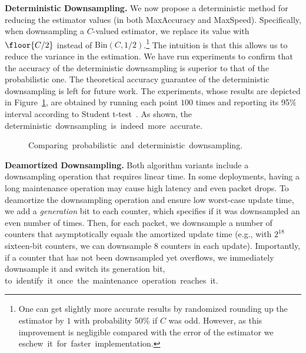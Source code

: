 \noindent\textbf{Deterministic Downsampling.}\quad{}
We now propose a deterministic method for reducing the estimator values (in both {\sc MaxAccuracy} and {\sc MaxSpeed}). Specifically, when downsampling a $C$-valued estimator, we replace its value with $\floor{C/2}$ instead of $\mbox{Bin}(C,1/2)$.\footnote{One can get slightly more accurate results by randomized rounding up the estimator by $1$ with probability 50\% if $C$ was odd. However, as this improvement is negligible compared with the error of the estimator we \mbox{eschew it for faster implementation.}} The intuition is that this allows us to reduce the variance in the estimation.
We have run experiments to confirm that the accuracy of the deterministic downsampling is superior to that of the probabilistic one. The theoretical accuracy guarantee of the deterministic downsampling is left for future work.
The experiments, whose results are depicted in Figure~\ref{fig:downsampling}, are obtained by running each point $100$ times and reporting its 95\% interval according to Student t-test~\cite{student1908probable}. As shown, the \mbox{deterministic downsampling is indeed more accurate.}
\begin{figure}[h]
\vspace*{-8mm}
\vspace*{-1mm}
\caption{\small \mbox{Comparing probabilistic and deterministic downsampling.\label{fig:downsampling}}}
\vspace*{-3mm}
\end{figure}

\noindent\textbf{Deamortized Downsampling.}\quad{} Both algorithm variants include a downsampling operation that requires linear time. In some deployments, having a long maintenance operation may cause high latency and even packet drops. To deamortize the downsampling operation and ensure low worst-case update time, we add a \emph{generation} bit to each counter, which specifies if it was downsampled an even number of times. Then, for each packet, we downsample a number of counters that asymptotically equals the amortized update time (e.g., with $2^{18}$ sixteen-bit counters, we can downsample $8$ counters in each update). Importantly, if a counter that has not been downsampled yet overflows, we immediately downsample it and switch its generation bit, \mbox{to identify it once the maintenance operation reaches it.}

